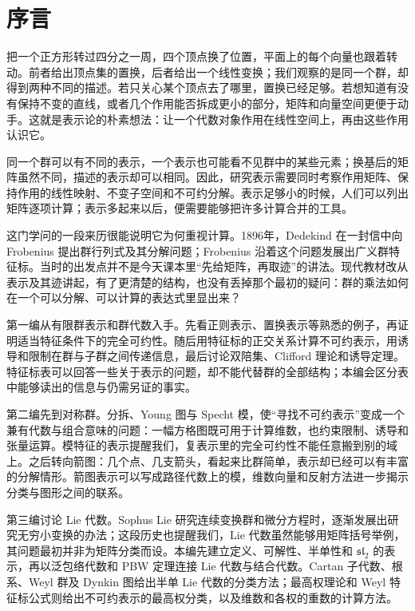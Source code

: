 \chapter*{序言}

把一个正方形转过四分之一周，四个顶点换了位置，平面上的每个向量也跟着转动。前者给出顶点集的置换，后者给出一个线性变换；我们观察的是同一个群，却得到两种不同的描述。若只关心某个顶点去了哪里，置换已经足够。若想知道有没有保持不变的直线，或者几个作用能否拆成更小的部分，矩阵和向量空间更便于动手。这就是表示论的朴素想法：让一个代数对象作用在线性空间上，再由这些作用认识它。

\ProseParagraphBreak
同一个群可以有不同的表示，一个表示也可能看不见群中的某些元素；换基后的矩阵虽然不同，描述的表示却可以相同。因此，研究表示需要同时考察作用矩阵、保持作用的线性映射、不变子空间和不可约分解。表示足够小的时候，人们可以列出矩阵逐项计算；表示多起来以后，便需要能够把许多计算合并的工具。

\ProseParagraphBreak
这门学问的一段来历很能说明它为何重视计算。1896年，Dedekind 在一封信中向 Frobenius 提出群行列式及其分解问题；Frobenius 沿着这个问题发展出广义群特征标。当时的出发点并不是今天课本里“先给矩阵，再取迹”的讲法\cite[Section 4.11]{EtingofEtAl2011RepresentationTheory}。现代教材改从表示及其迹讲起，有了更清楚的结构，也没有丢掉那个最初的疑问：群的乘法如何在一个可以分解、可以计算的表达式里显出来？

\ProseParagraphBreak
第一编从有限群表示和群代数入手。先看正则表示、置换表示等熟悉的例子，再证明适当特征条件下的完全可约性。随后用特征标的正交关系计算不可约表示，用诱导和限制在群与子群之间传递信息，最后讨论双陪集、Clifford 理论和诱导定理。特征标表可以回答一些关于表示的问题，却不能代替群的全部结构；本编会区分表中能够读出的信息与仍需另证的事实。

\ProseParagraphBreak
第二编先到对称群。分拆、Young 图与 Specht 模，使“寻找不可约表示”变成一个兼有代数与组合意味的问题：一幅方格图既可用于计算维数，也约束限制、诱导和张量运算。模特征的表示提醒我们，复表示里的完全可约性不能任意搬到别的域上。之后转向箭图：几个点、几支箭头，看起来比群简单，表示却已经可以有丰富的分解情形。箭图表示可以写成路径代数上的模，维数向量和反射方法进一步揭示分类与图形之间的联系。

\ProseParagraphBreak
第三编讨论 Lie 代数。Sophus Lie 研究连续变换群和微分方程时，逐渐发展出研究无穷小变换的办法；这段历史也提醒我们，Lie 代数虽然能够用矩阵括号举例，其问题最初并非为矩阵分类而设\cite[Section 2.10]{EtingofEtAl2011RepresentationTheory}。本编先建立定义、可解性、半单性和 \(\mathfrak{sl}_2\) 的表示，再以泛包络代数和 PBW 定理连接 Lie 代数与结合代数。Cartan 子代数、根系、Weyl 群及 Dynkin 图给出半单 Lie 代数的分类方法；最高权理论和 Weyl 特征标公式则给出不可约表示的最高权分类，以及维数和各权的重数的计算方法。

